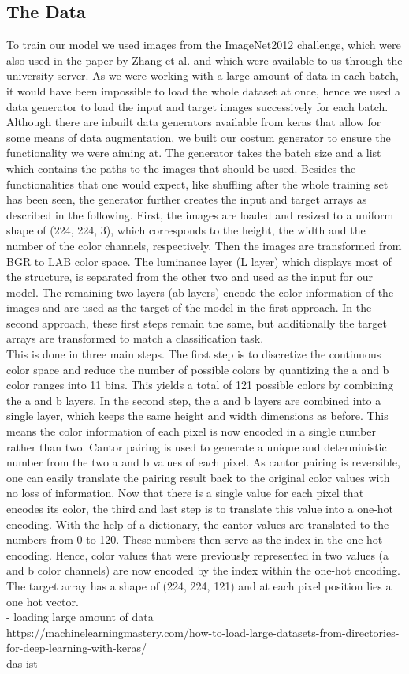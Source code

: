 \documentclass[12pt,letterpaper]{article}
\begin{document}
\subsection{The Data}
To train our model we used images from the ImageNet2012 challenge, which were also used in the paper by Zhang et al. and which were available to us through the university server. As we were working with a large amount of data in each batch, it would have been impossible to load the whole dataset at once, hence we used a data generator to load the input and target images successively for each batch. Although there are inbuilt data generators available from keras that allow for some means of data augmentation, we built our costum generator to ensure the functionality we were aiming at. The generator takes the batch size and a list which contains the paths to the images that should be used. Besides the functionalities that one would expect, like shuffling after the whole training set has been seen, the generator further creates the input and target arrays as described in the following.
First, the images are loaded and resized to a uniform shape of (224, 224, 3), which corresponds to the height, the width and the number of the color channels, respectively. Then the images are transformed from BGR to LAB color space. The luminance layer (L layer) which displays most of the structure, is separated from the other two and used as the input for our model.  The remaining two layers (ab layers) encode the color information of the images and are used as the target of the model in the first approach. In the second approach, these first steps remain the same, but additionally the target arrays are transformed to match a classification task.\\
This is done in three main steps. The first step is to discretize the continuous color space and reduce the number of possible colors by quantizing the a and b color ranges into 11 bins. This yields a total of 121 possible colors by combining the a and b layers. In the second step, the a and b layers are combined into a single layer, which keeps the same height and width dimensions as before. This means the color information of each pixel is now encoded in a single number rather than two. Cantor pairing is used to generate a unique and deterministic number from the two a and b values of each pixel. As cantor pairing is reversible, one can easily translate the pairing result back to the original color values with no loss of information. Now that there is a single value for each pixel that encodes its color, the third and last step is to translate this value into a one-hot encoding. With the help of a dictionary, the cantor values are translated to the numbers from 0 to 120. These numbers then serve as the index in the one hot encoding. Hence, color values that were previously represented in two values (a and b color channels) are now encoded by the index within the one-hot encoding. The target array has a shape of (224, 224, 121) and at each pixel position lies a one hot vector.\\
- loading large amount of data\\
\url{https://machinelearningmastery.com/how-to-load-large-datasets-from-directories-for-deep-learning-with-keras/}\\
das ist \citep{Brownlee.2019}
\end{document}
